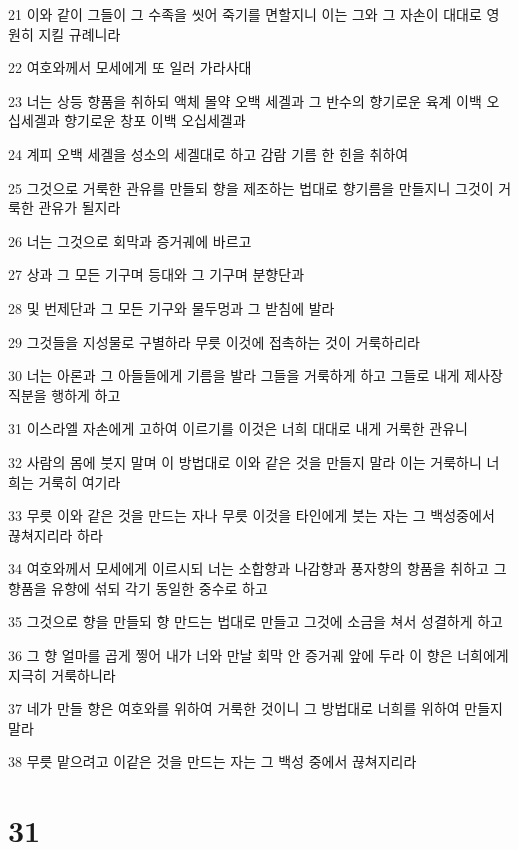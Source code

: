\par 21 이와 같이 그들이 그 수족을 씻어 죽기를 면할지니 이는 그와 그 자손이 대대로 영원히 지킬 규례니라
\par 22 여호와께서 모세에게 또 일러 가라사대
\par 23 너는 상등 향품을 취하되 액체 몰약 오백 세겔과 그 반수의 향기로운 육계 이백 오십세겔과 향기로운 창포 이백 오십세겔과
\par 24 계피 오백 세겔을 성소의 세겔대로 하고 감람 기름 한 힌을 취하여
\par 25 그것으로 거룩한 관유를 만들되 향을 제조하는 법대로 향기름을 만들지니 그것이 거룩한 관유가 될지라
\par 26 너는 그것으로 회막과 증거궤에 바르고
\par 27 상과 그 모든 기구며 등대와 그 기구며 분향단과
\par 28 및 번제단과 그 모든 기구와 물두멍과 그 받침에 발라
\par 29 그것들을 지성물로 구별하라 무릇 이것에 접촉하는 것이 거룩하리라
\par 30 너는 아론과 그 아들들에게 기름을 발라 그들을 거룩하게 하고 그들로 내게 제사장 직분을 행하게 하고
\par 31 이스라엘 자손에게 고하여 이르기를 이것은 너희 대대로 내게 거룩한 관유니
\par 32 사람의 몸에 붓지 말며 이 방법대로 이와 같은 것을 만들지 말라 이는 거룩하니 너희는 거룩히 여기라
\par 33 무릇 이와 같은 것을 만드는 자나 무릇 이것을 타인에게 붓는 자는 그 백성중에서 끊쳐지리라 하라
\par 34 여호와께서 모세에게 이르시되 너는 소합향과 나감향과 풍자향의 향품을 취하고 그 향품을 유향에 섞되 각기 동일한 중수로 하고
\par 35 그것으로 향을 만들되 향 만드는 법대로 만들고 그것에 소금을 쳐서 성결하게 하고
\par 36 그 향 얼마를 곱게 찧어 내가 너와 만날 회막 안 증거궤 앞에 두라 이 향은 너희에게 지극히 거룩하니라
\par 37 네가 만들 향은 여호와를 위하여 거룩한 것이니 그 방법대로 너희를 위하여 만들지 말라
\par 38 무릇 맡으려고 이같은 것을 만드는 자는 그 백성 중에서 끊쳐지리라

\chapter{31}

